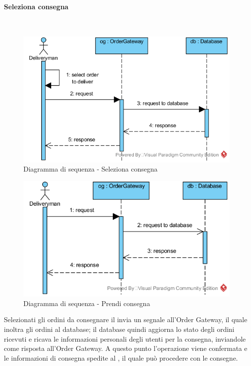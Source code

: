 \begin{samepage}
\paragraph{Seleziona consegna}\mbox{}\\
\end{samepage}
\begin{figure}[H]
	\centering
	\includegraphics[width=15cm]{../../documenti/SpecificaTecnica/diagrammi_img/sequenza/fattorino_seleziona_consegna.png}
	\caption{Diagramma di sequenza - Seleziona consegna}
\end{figure}
\begin{figure}[H]
	\centering
	\includegraphics[width=15cm]{../../documenti/SpecificaTecnica/diagrammi_img/sequenza/fattorino_prendi_consegna.png}
	\caption{Diagramma di sequenza - Prendi consegna}
\end{figure}
Selezionati gli ordini da consegnare il \Deliveryman{} invia un segnale all'Order Gateway, il quale inoltra gli ordini al database; il database quindi aggiorna lo stato degli ordini ricevuti e ricava le informazioni personali degli utenti per la consegna, inviandole come risposta all'Order Gateway. A questo punto l'operazione viene confermata e le informazioni di consegna spedite al \Deliveryman{}, il quale può procedere con le consegne.

